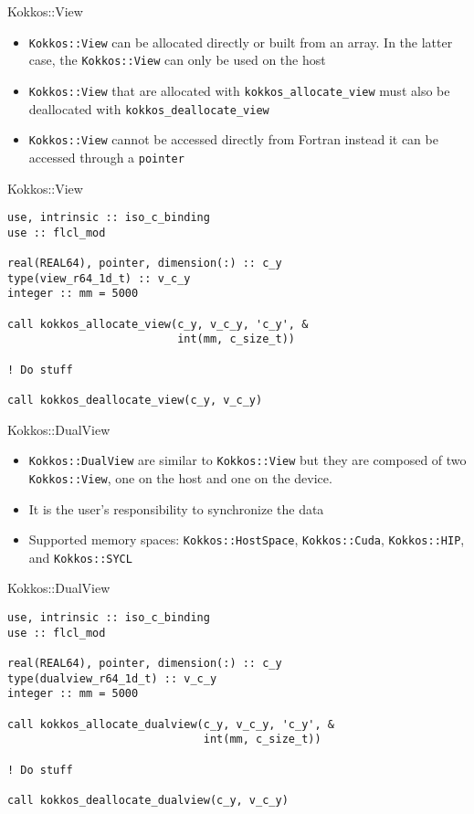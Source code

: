 \begin{frame}{Kokkos::View}
  \begin{itemize}
    \item \texttt{Kokkos::View} can be allocated directly or built from an
      array. In the latter case, the \texttt{Kokkos::View} can only be used on
      the host %
    \item \texttt{Kokkos::View} that are allocated with
      \texttt{kokkos\_allocate\_view} must also be deallocated with
      \texttt{kokkos\kokkos_deallocate_view}
    \item \texttt{Kokkos::View} cannot be accessed directly from Fortran instead
      it can be accessed through a \texttt{pointer}
  \end{itemize}
\end{frame}

\begin{frame}[containsverbatim]{Kokkos::View}
  \begin{verbatim}
use, intrinsic :: iso_c_binding
use :: flcl_mod

real(REAL64), pointer, dimension(:) :: c_y
type(view_r64_1d_t) :: v_c_y
integer :: mm = 5000

call kokkos_allocate_view(c_y, v_c_y, 'c_y', &
                          int(mm, c_size_t))

! Do stuff

call kokkos_deallocate_view(c_y, v_c_y)
  \end{verbatim}
\end{frame}

\begin{frame}{Kokkos::DualView}
  \begin{itemize}
    \item \texttt{Kokkos::DualView} are similar to \texttt{Kokkos::View} but
      they are composed of two \texttt{Kokkos::View}, one on the host and one on
      the device.
    \item It is the user's responsibility to synchronize the data
    \item Supported memory spaces: \texttt{Kokkos::HostSpace},
      \texttt{Kokkos::Cuda}, \texttt{Kokkos::HIP}, and \texttt{Kokkos::SYCL}
  \end{itemize}
\end{frame}

\begin{frame}[containsverbatim]{Kokkos::DualView}
  \begin{verbatim}
use, intrinsic :: iso_c_binding
use :: flcl_mod

real(REAL64), pointer, dimension(:) :: c_y
type(dualview_r64_1d_t) :: v_c_y
integer :: mm = 5000

call kokkos_allocate_dualview(c_y, v_c_y, 'c_y', &
                              int(mm, c_size_t))

! Do stuff

call kokkos_deallocate_dualview(c_y, v_c_y)
  \end{verbatim}
\end{frame}

